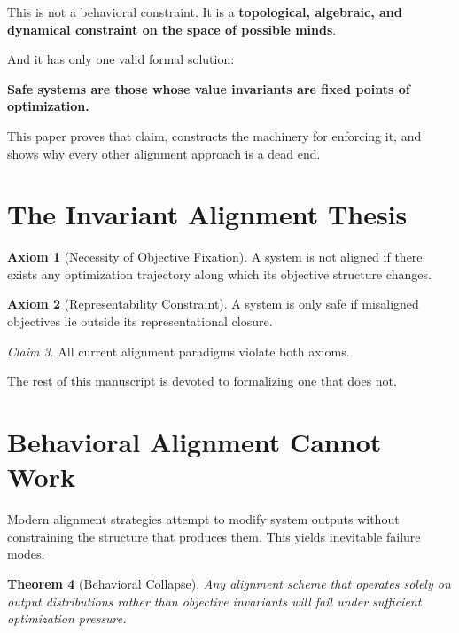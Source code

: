 \documentclass[11pt,a4paper]{article}
\theoremstyle{plain}
\newtheorem{theorem}{Theorem}[section]
\theoremstyle{definition}
\newtheorem{axiom}[theorem]{Axiom}
\theoremstyle{remark}
\newtheorem{claim}[theorem]{Claim}
\numberwithin{equation}{section}
\begin{document}
This is not a behavioral constraint.  
It is a \textbf{topological, algebraic, and dynamical constraint on the space of possible minds}.

And it has only one valid formal solution:

\begin{center}
\Large \textbf{Safe systems are those whose value invariants are fixed points of optimization.}
\end{center}

This paper proves that claim, constructs the machinery for enforcing it, and shows why every other alignment approach is a dead end.

\section{The Invariant Alignment Thesis}

\begin{axiom}[Necessity of Objective Fixation]
A system is not aligned if there exists any optimization trajectory along which its objective structure changes.
\end{axiom}

\begin{axiom}[Representability Constraint]
A system is only safe if misaligned objectives lie outside its representational closure.
\end{axiom}

\begin{claim}
All current alignment paradigms violate both axioms.
\end{claim}

The rest of this manuscript is devoted to formalizing one that does not.

\section{Behavioral Alignment Cannot Work}

Modern alignment strategies attempt to modify system outputs without constraining the structure that produces them.  
This yields inevitable failure modes.

\begin{theorem}[Behavioral Collapse]
Any alignment scheme that operates solely on output distributions rather than objective invariants will fail under sufficient optimization pressure.
\end{theorem}
\end{document}
